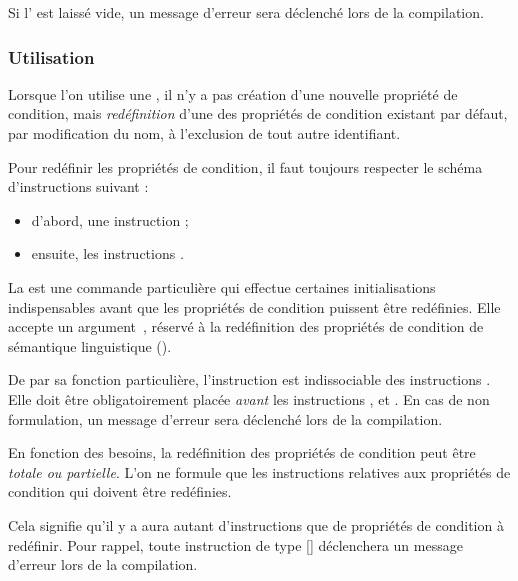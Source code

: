 \documentclass{article}
\begin{document}
Si l' est laissé vide, un message d'erreur sera déclenché lors de la compilation.

\subsubsection{Utilisation}\label{CtDoc_Commandes_SetMiniCondiProp-_Utilisation}
Lorsque l'on utilise une , il n'y a pas création d'une nouvelle propriété de condition, mais \emph{redéfinition} d'une des propriétés de condition existant par défaut, par modification du nom, à l'exclusion de tout autre identifiant.

Pour redéfinir les propriétés de condition, il faut toujours respecter le schéma d'instructions suivant :

\begin{itemize}
    \item d'abord, une instruction  ;
    \item ensuite, les instructions .
\end{itemize}

La  est une commande particulière qui effectue certaines initialisations indispensables avant que les propriétés de condition puissent être redéfinies. Elle accepte un argument~\val{*}, réservé à la redéfinition des propriétés de condition de sémantique linguistique ().

De par sa fonction particulière, l'instruction  est indissociable des instructions . Elle doit être obligatoirement placée \emph{avant} les instructions ,  et . En cas de non formulation, un message d'erreur sera déclenché lors de la compilation.

En fonction des besoins, la redéfinition des propriétés de condition peut être \emph{totale ou partielle}. L'on ne formule que les instructions  relatives aux propriétés de condition qui doivent être redéfinies.

Cela signifie qu'il y a aura autant d'instructions  que de propriétés de condition à redéfinir. Pour rappel, toute instruction de type [\argmvoid{}] déclenchera un message d'erreur lors de la compilation.
\end{document}
